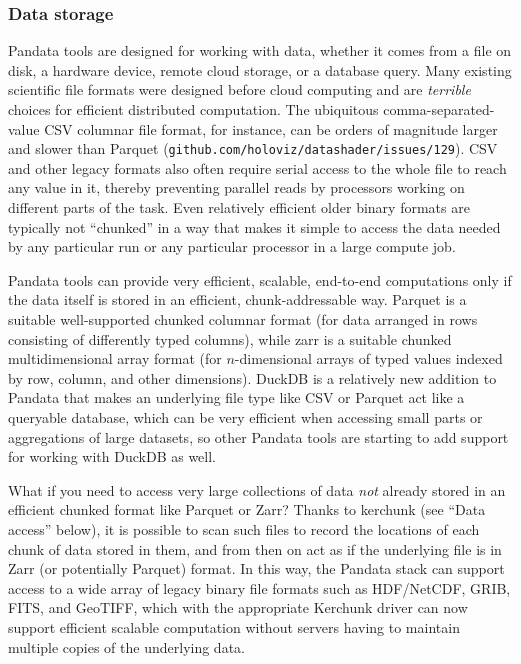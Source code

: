 \subsubsection{Data storage}

Pandata tools are designed for working with data, whether it comes from a file on disk, a hardware device, remote cloud storage, or a database query. Many existing scientific file formats were designed before cloud computing and are \emph{terrible} choices for efficient distributed computation. The ubiquitous comma-separated-value CSV columnar file format, for instance, can be orders of magnitude larger and slower than Parquet (\texttt{github.com/holoviz/datashader/issues/129}). CSV and other legacy formats also often require serial access to the whole file to reach any value in it, thereby preventing parallel reads by processors working on different parts of the task. Even relatively efficient older binary formats are typically not ``chunked'' in a way that makes it simple to access the data needed by any particular run or any particular processor in a large compute job.

Pandata tools can provide very efficient, scalable, end-to-end computations only if the data itself is stored in an efficient, chunk-addressable way. Parquet is a suitable well-supported chunked columnar format (for data arranged in rows consisting of differently typed columns), while zarr is a suitable chunked multidimensional array format (for $n$-dimensional arrays of typed values indexed by row, column, and other dimensions). DuckDB is a relatively new addition to Pandata that makes an underlying file type like CSV or Parquet act like a queryable database, which can be very efficient when accessing small parts or aggregations of large datasets, so other Pandata tools are starting to add support for working with DuckDB as well.

What if you need to access very large collections of data \emph{not} already stored in an efficient chunked format like Parquet or Zarr? Thanks to kerchunk (see ``Data access'' below), it is possible to scan such files to record the locations of each chunk of data stored in them, and from then on act as if the underlying file is in Zarr (or potentially Parquet) format. In this way, the Pandata stack can support access to a wide array of legacy binary file formats such as HDF/NetCDF, GRIB, FITS, and GeoTIFF, which with the appropriate Kerchunk driver can now support efficient scalable computation without servers having to maintain multiple copies of the underlying data.

